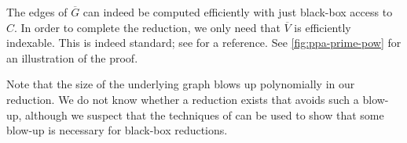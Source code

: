 The edges of $\overline{G}$ can indeed be computed efficiently with just black-box access to $C$. In order to complete the reduction, we only need that $\overline{V}$ is efficiently indexable. This is indeed standard; see \cite[\S2.3]{r31} for a reference. See \autoref{fig:ppa-prime-pow} for an illustration of the proof.

\begin{remark}
Note that the size of the underlying graph blows up polynomially in our reduction. We do not know whether a reduction exists that avoids such a blow-up, although we suspect that the techniques of \cite{r6} can be used to show that some blow-up is necessary for black-box reductions.
\end{remark}


 
